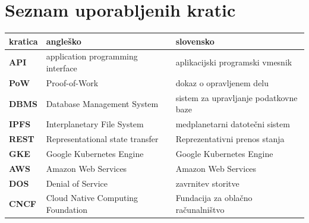 \documentclass[a4paper, 12pt]{book}
\newcommand{\clearemptydoublepage}{\newpage{\pagestyle{empty}\cleardoublepage}}
\begin{document}
\clearemptydoublepage


\pagestyle{empty}
\def\thepage{}%
\tableofcontents{}


\clearemptydoublepage


\chapter*{Seznam uporabljenih kratic}  %

\noindent\begin{tabular}{p{}|p{}|p{}}    %
  {\bf kratica} & {\bf angleško}                             & {\bf slovensko} \\ \hline
  {\bf API}      & application programming interface & aplikacijski programski vmesnik \\
  {\bf PoW} & Proof-of-Work & dokaz o opravljenem delu \\
  {\bf DBMS}   & Database Management System & sistem za upravljanje podatkovne baze \\
  {\bf IPFS} & Interplanetary File System & medplanetarni datotečni sistem \\
  {\bf REST} & Representational state transfer & Reprezentativni prenos stanja \\
  {\bf GKE} & Google Kubernetes Engine & Google Kubernetes Engine \\
  {\bf AWS} & Amazon Web Services & Amazon Web Services \\
  {\bf DOS} & Denial of Service & zavrnitev storitve \\
  {\bf CNCF} & Cloud Native Computing Foundation & Fundacija za oblačno računalništvo \\
\end{tabular}
\end{document}

